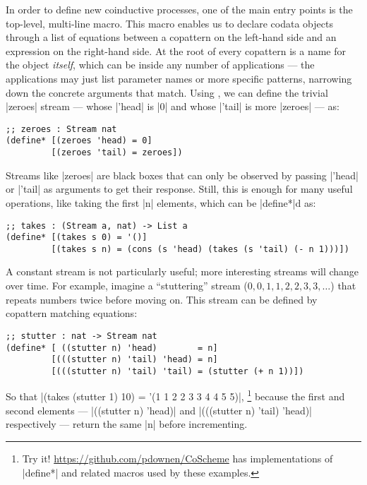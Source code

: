 In order to define new coinductive processes, one of the main entry points is the top-level, multi-line  macro.
This macro enables us to declare codata objects through a list of equations between a copattern on the left-hand side and an expression on the right-hand side.
At the root of every copattern is a name for the object \emph{itself}, which can be inside any number of applications --- the applications may just list parameter names or more specific patterns, narrowing down the concrete arguments that match.
Using , we can define the trivial \scm|zeroes| stream  --- whose \scm|'head| is \scm|0| and whose \scm|'tail| is more \scm|zeroes| --- as:
\begin{verbatim}
;; zeroes : Stream nat
(define* [(zeroes 'head) = 0]
         [(zeroes 'tail) = zeroes])
\end{verbatim}
Streams like \scm|zeroes| are black boxes that can only be observed by passing \scm|'head| or \scm|'tail| as arguments to get their response.
Still, this is enough for many useful operations, like taking the first \scm|n| elements, which can be \scm|define*|d as:
\begin{verbatim}
;; takes : (Stream a, nat) -> List a
(define* [(takes s 0) = '()]
         [(takes s n) = (cons (s 'head) (takes (s 'tail) (- n 1)))])
\end{verbatim}
A constant stream is not particularly useful; more interesting streams will change over time.
For example, imagine a ``stuttering'' stream ($0, 0, 1, 1, 2, 2, 3, 3, \dots$) that repeats numbers twice before moving on.
This stream can be defined by copattern matching equations:
\begin{verbatim}
;; stutter : nat -> Stream nat
(define* [ ((stutter n) 'head)        = n]
         [(((stutter n) 'tail) 'head) = n]
         [(((stutter n) 'tail) 'tail) = (stutter (+ n 1))])
\end{verbatim}
So that \scm|(takes (stutter 1) 10) = '(1 1 2 2 3 3 4 4 5 5)|,%
\footnote{
  Try it!
  \url{https://github.com/pdownen/CoScheme} has implementations of \scm|define*| and related macros used by these examples.
}
because the first and second elements --- \scm|((stutter n) 'head)| and \scm|(((stutter n) 'tail) 'head)| respectively --- return the same \scm|n| before incrementing.

